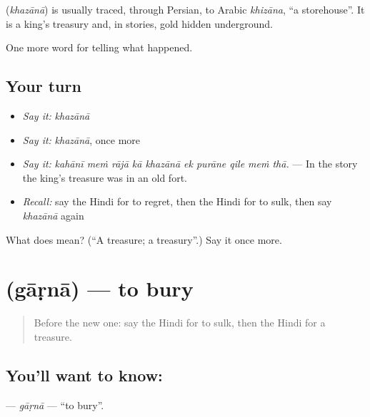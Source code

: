 \begin{cousinweb}
\textbf{} (\emph{khazānā}) is usually traced, through Persian, to Arabic \emph{khizāna}, \textquotedblleft{}a storehouse\textquotedblright{}. It is a king's treasury and, in stories, gold hidden underground.
\end{cousinweb}

\begin{grammarlens}[title={What you've built}]
One more word for telling what happened.
\end{grammarlens}

\subsection*{Your turn}
\begin{itemize}
\raggedright
  \item \emph{Say it:} \emph{khazānā}
  \item \emph{Say it:} \emph{khazānā}, once more
  \item \emph{Say it:} \emph{kahānī meṁ rājā kā khazānā ek purāne qile meṁ thā.} — In the story the king's treasure was in an old fort.
  \item \emph{Recall:} say the Hindi for to regret, then the Hindi for to sulk, then say \emph{khazānā} again
\end{itemize}

\begin{tcolorbox}[breakable,colback=teal!4,colframe=teal!35!black,title={Before you move on}]
What does  mean? (\textquotedblleft{}A treasure; a treasury\textquotedblright{}.) Say it once more.
\end{tcolorbox}
\section[\texorpdfstring{\hi{गाड़ना} (gāṛnā)}{गाड़ना (gāṛnā)}]{ (gāṛnā) — to bury}

\label{lesson:HI-C337-garna}



\begin{quote}
Before the new one: say the Hindi for to sulk, then the Hindi for a treasure.
\end{quote}

\subsection*{You'll want to know: }
\textbf{} — \emph{gāṛnā} — \textquotedblleft{}to bury\textquotedblright{}.

